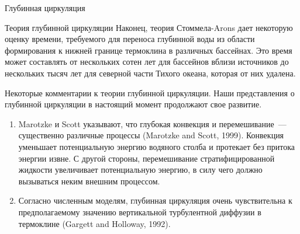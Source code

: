\begin{chapter}{Глубинная циркуляция}
\begin{section}{Теория глубинной циркуляции}
Наконец, теория Стоммела-Arons дает некоторую оценку времени, требуемого для
переноса глубинной воды из области формирования к нижней границе 
термоклина в различных бассейнах. Это время может составлять
от нескольких сотен лет для бассейнов вблизи источников до нескольких тысяч лет
для северной части Тихого океана, которая от них 
удалена.
%

\begin{paragraph}{Некоторые комментарии к теории глубинной циркуляции.} 
Наши представления о глубинной циркуляции в настоящий момент продолжают 
свое развитие.
\begin{enumerate}
\item 
Marotzke и Scott указывают, что глубокая конвекция и 
перемешивание~--- существенно различные
процессы (Marotzke and Scott, 1999). Конвекция уменьшает потенциальную 
энергию водяного столба и протекает без притока энергии извне. С другой
стороны, перемешивание стратифицированной жидкости увеличивает потенциальную
энергию, в силу чего должно вызываться неким внешним процессом.
%

\item
Согласно численным моделям, глубинная циркуляция очень чувствительна к 
предполагаемому значению вертикальной турбулентной диффузии в
термоклине (Gargett and
Holloway, 1992).
%


\end{enumerate}
\end{paragraph}
\end{section}
\end{chapter}
